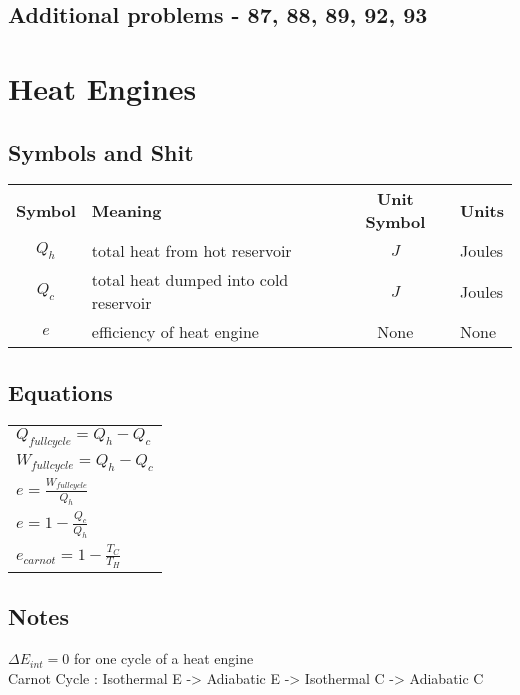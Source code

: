 \documentclass[12pt, letterpaper, twoside]{article}
\begin{document}
  \subsection*{Additional problems - 87, 88, 89, 92, 93}
  
  
  
\section{Heat Engines}
  \subsection*{Symbols and Shit}
    \begin{tabular}{c l c l}
  	  \textbf{Symbol} & \textbf{Meaning} & \textbf{Unit Symbol} & \textbf{Units}\\
  	  $Q_h$ & total heat from hot reservoir & $J$ & Joules\\
  	  $Q_c$ & total heat dumped into cold reservoir & $J$ & Joules\\
  	  $e$ & efficiency of heat engine & None & None\\
  	  
    \end{tabular}
  
  \subsection*{Equations}
    \begin{tabular}{l}
      $Q_{full cycle} = Q_h - Q_c$\\
      $W_{full cycle} = Q_h - Q_c$\\
      $e = \frac{W_{full cycle}}{Q_h}$\\
      $e = 1 - \frac{Q_c}{Q_h}$\\
      $e_{carnot} = 1 - \frac{T_C}{T_H}$\\
      
    \end{tabular}
  
  \subsection*{Notes}
    $\Delta E_{int} = 0$ for one cycle of a heat engine\\
    Carnot Cycle : Isothermal E -> Adiabatic E -> Isothermal C -> Adiabatic C\\
    
\end{document}
